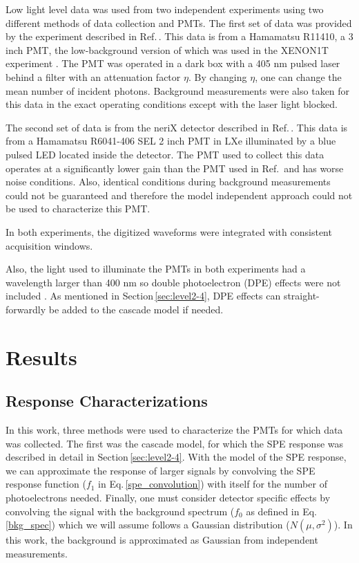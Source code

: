 \documentclass[11pt,a4paper]{article}
\newcommand\eqnref[1]{Eq.\,\ref{#1}}
\newcommand\secref[1]{Section\,\ref{#1}}
\newcommand\citeref[1]{Ref.\,\cite{#1}}
\begin{document}
Low light level data was used from two independent experiments using two different methods of data collection and PMTs.  The first set of data was provided by the experiment described in \citeref{saldanha}.  This data is from a Hamamatsu R11410, a 3 inch PMT, the low-background version of which was used in the XENON1T experiment \cite{xenon1t}. The PMT was operated in a dark box with a 405 nm pulsed laser behind a filter with an attenuation factor $\eta$.  By changing $\eta$, one can change the mean number of incident photons.  Background measurements were also taken for this data in the exact operating conditions except with the laser light blocked.

The second set of data is from the neriX detector described in \citeref{goetzke}.  This data is from a Hamamatsu R6041-406 SEL 2 inch PMT in LXe illuminated by a blue pulsed LED located inside the detector.  The PMT used to collect this data operates at a significantly lower gain than the PMT used in \citeref{saldanha} and has worse noise conditions.  Also, identical conditions during background measurements could not be guaranteed and therefore the model independent approach could not be used to characterize this PMT.

In both experiments, the digitized waveforms were integrated with consistent acquisition windows.

Also, the light used to illuminate the PMTs in both experiments had a wavelength larger than 400 nm so double photoelectron (DPE) effects were not included \cite{dpe}.  As mentioned in \secref{sec:level2-4}, DPE effects can straight-forwardly be added to the cascade model if needed.





\section{\label{sec:level3}Results}

\subsection{\label{sec:levelres-char}Response Characterizations}

In this work, three methods were used to characterize the PMTs for which data was collected.  The first was the cascade model, for which the SPE response was described in detail in \secref{sec:level2-4}.  With the model of the SPE response, we can approximate the response of larger signals by convolving the SPE response function ($f_1$ in \eqnref{spe_convolution}) with itself for the number of photoelectrons needed.  Finally, one must consider detector specific effects by convolving the signal with the background spectrum ($f_0$ as defined in \eqnref{bkg_spec}) which we will assume follows a Gaussian distribution ($N(\mu, \sigma^2)$).  In this work, the background is approximated as Gaussian from independent measurements.
\end{document}

